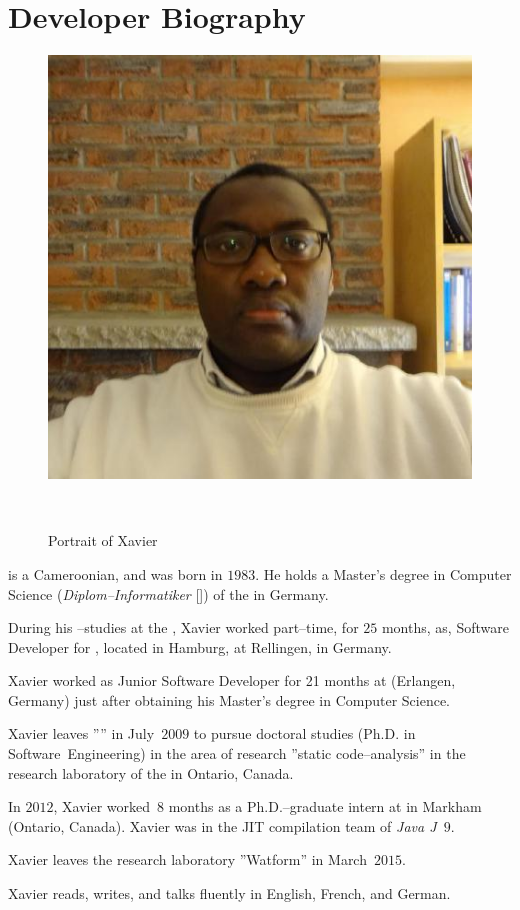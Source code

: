 \section{Developer Biography}\label{chap:biography}
\vspace{-0.9em}
\begin{figure}[!htpb]
\centering
\includegraphics[scale=0.35]{../../francais/images/XavierNOUNDOU-2}
\caption{Portrait of Xavier}~\label{fig:xaviernoumbis}
\end{figure}

 is a Cameroonian,
and was born in $1983$.
He holds a Master's degree in Computer Science
(\emph{Diplom--Informatiker} [\emph{\diplinf}]) of
the \textbf{\unibremen} in Germany.

During his \diplinf--studies at the \unibremen, Xavier worked
part--time, for $25$ months, as, Software Developer for
\textbf{\bergmann}, located in Hamburg, at Rellingen, in Germany.

Xavier worked as Junior Software Developer for 21 months
at \company{\siemens} (Erlangen, Germany) just after
obtaining his Master's degree in Computer Science.

Xavier leaves ''\siemens'' in July~$2009$ to pursue doctoral
studies (Ph.D. in Software~Engineering) in the area of research
''static code--analysis'' in the research laboratory
 of the  
in Ontario, Canada.

In $2012$, Xavier worked~$8$ months as a Ph.D.--graduate intern
at  in Markham (Ontario, Canada).
Xavier was in the JIT compilation team of \emph{Java J~$9$}.

Xavier leaves the research laboratory ''Watform'' in March~$2015$.

Xavier reads, writes, and talks fluently in English,
French, and German.
